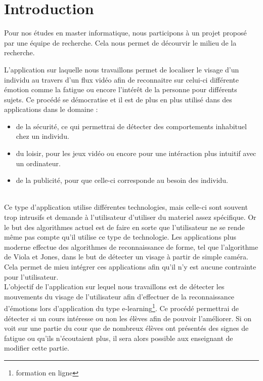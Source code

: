 \section{Introduction}

Pour nos études en master informatique, nous participons à un projet proposé par une 
équipe de recherche. Cela nous permet de décourvir le milieu de la recherche.

L'application sur laquelle nous travaillons permet de localiser le visage
d'un individu au travers d'un flux vidéo afin de reconnaitre sur celui-ci différente
émotion comme la fatigue ou encore l'intérêt de la personne pour différents sujets. Ce procédé
se démocratise et il est de plus en plus utilisé dans des applications dans le domaine : 
\begin{itemize}
 \item de la sécurité, ce qui permettrai de détecter des comportements inhabituel chez un individu.
 \item du loisir, pour les jeux vidéo ou encore pour une intéraction plus intuitif avec un ordinateur.
 \item de la publicité, pour que celle-ci corresponde au besoin des individu. 
\end{itemize}
\ \\
Ce type d'application utilise différentes technologies, mais celle-ci sont souvent trop intrusifs 
et demande à l'utilisateur d'utiliser du materiel assez spécifique. Or le but des algorithmes actuel
est de faire en sorte que l'utilisateur ne se rende même pas compte qu'il utilise ce type de technologie. Les applications plus 
moderne effectue des algorithmes de reconnaissance de forme, tel que l'algorithme de Viola et Jones, dans 
le but de détecter un visage à partir de simple caméra. Cela permet de mieu intégrer ces applications 
afin qu'il n'y est aucune contrainte pour l'utilisateur.\\

L'objectif de l'application sur lequel nous travaillons est de détecter les mouvements
du visage de l'utilisateur afin d'effectuer de la reconnaissance d'émotions lors d'application
du type e-learning\footnote{formation en ligne}. Ce procédé permettrai de détecter si un cours 
intéresse ou non les élèves afin de pouvoir l'améliorer. Si on voit sur une partie du cour
que de nombreux élèves ont présentés des signes de fatigue ou qu'ils n'écoutaient plus, il sera
alors possible aux enseignant de modifier cette partie.


